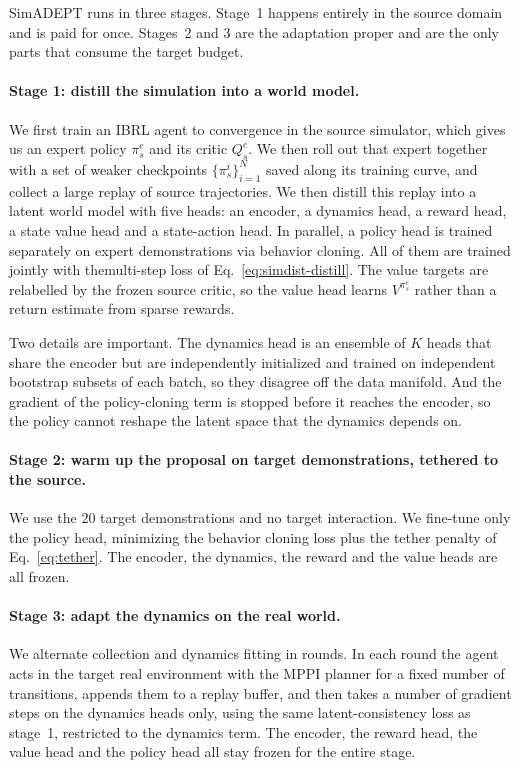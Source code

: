 \documentclass{article} %
\begin{document}
SimADEPT runs in three stages. Stage~1 happens entirely in the source domain and is paid for once. Stages~2 and 3 are the adaptation proper and are the only parts that consume the target budget.

\paragraph{Stage 1: distill the simulation into a world model.}
We first train an IBRL agent to convergence in the source simulator, which gives us an expert policy $\pi_s^e$ and its critic $Q_s^e$. We then roll out that expert together with a set of weaker checkpoints $\{\pi_s^i\}^N_{i=1}$ saved along its training curve, and collect a large replay of source trajectories. We then distill this replay into a latent world model with five heads: an encoder, a dynamics head, a reward head, a state value head and a state-action head. In parallel, a policy head is trained separately on expert demonstrations via behavior cloning. All of them are trained jointly with themulti-step loss of Eq.~\ref{eq:simdist-distill}. The value targets are relabelled by the frozen source critic, so the value head learns $V^{\pi_s^e}$ rather than a return estimate from sparse rewards.

Two details are important. The dynamics head is an ensemble of $K$ heads that share the encoder but are independently initialized and trained on independent bootstrap subsets of each batch, so they disagree off the data manifold. And the gradient of the policy-cloning term is stopped before it reaches the encoder, so the policy cannot reshape the latent space that the dynamics depends on.

\paragraph{Stage 2: warm up the proposal on target demonstrations, tethered to the source.}
We use the $20$ target demonstrations and no target interaction. We fine-tune only the policy head, minimizing the behavior cloning loss plus the tether penalty of Eq.~\ref{eq:tether}. The encoder, the dynamics, the reward and the value heads are all frozen.

\paragraph{Stage 3: adapt the dynamics on the real world.}
We alternate collection and dynamics fitting in rounds. In each round the agent acts in the target real environment with the MPPI planner for a fixed number of transitions, appends them to a replay buffer, and then takes a number of gradient steps on the dynamics heads only, using the same latent-consistency loss as stage~1, restricted to the dynamics term. The encoder, the reward head, the value head and the policy head all stay frozen for the entire stage.
\end{document}
